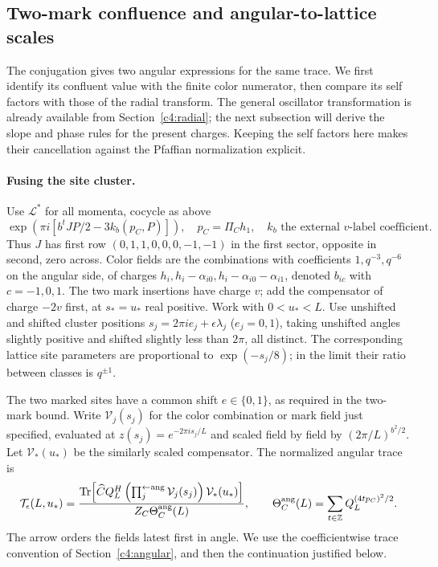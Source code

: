 \subsection{Two-mark confluence and angular-to-lattice scales}\label{c4:pair-confluence}

The conjugation gives two angular expressions for the same trace. We
first identify its confluent value with the finite color numerator, then
compare its self factors with those of the radial transform. The general
oscillator transformation is already available from
Section~\ref{c4:radial}; the next subsection will derive the slope and
phase rules for the present charges. Keeping the self factors here makes
their cancellation against the Pfaffian normalization explicit.

\paragraph{Fusing the site cluster.} Use \(\mathcal L^*\) for all momenta, cocycle as above
\[
 \exp(\pi i[b^t J P/2-3 k_b(p_C,P)]),\quad p_C=\Pi_C h_1,\quad k_b\text{ the external }v\text{-label coefficient}.
\]
Thus \(J\) has first row \((0,1,1,0,0,0,-1,-1)\) in the first sector, opposite in second, zero across. Color fields are the combinations with coefficients \(1,q^{-3},q^{-6}\) on the angular side, of charges \(h_i,h_i-\alpha_{i0},h_i-\alpha_{i0}-\alpha_{i1}\), denoted \(b_{ic}\) with \(c=-1,0,1\). The two mark insertions have charge \(v\); add the compensator of charge \(-2v\) first, at \(s_*=u_*\) real positive. Work with \(0<u_*<L\). Use unshifted and shifted cluster positions \(s_j=2\pi i e_j+\epsilon\lambda_j\) (\(e_j=0,1\)), taking unshifted angles slightly positive and shifted slightly less than \(2\pi\), all distinct. The corresponding lattice site parameters are proportional to \(\exp(-s_j/8)\); in the limit their ratio between classes is \(q^{\pm1}\).

The two marked sites have a common shift \(e\in\{0,1\}\), as required
in the two-mark bound. Write \(\mathcal V_j(s_j)\) for the color combination or mark field just
specified, evaluated at \(z(s_j)=e^{-2\pi i s_j/L}\) and scaled field by
field by \((2\pi/L)^{b^2/2}\). Let \(\mathcal V_*(u_*)\) be the similarly
scaled compensator. The normalized angular trace is
\[
 \mathcal T_\epsilon(L,u_*)=
 \frac{\operatorname{Tr}\!\left[\widehat C Q_L^H
       \left(\prod_j^{\leftarrow\mathrm{ang}}\mathcal V_j(s_j)\right)
       \mathcal V_*(u_*)\right]}
      {Z_C\Theta_C^{\mathrm{ang}}(L)},\qquad
 \Theta_C^{\mathrm{ang}}(L)=
       \sum_{t\in\mathbb Z}Q_L^{(4tp_C)^2/2}.
\]
The arrow orders the fields latest first in angle. We use the
coefficientwise trace convention of Section~\ref{c4:angular}, and then
the continuation justified below.

